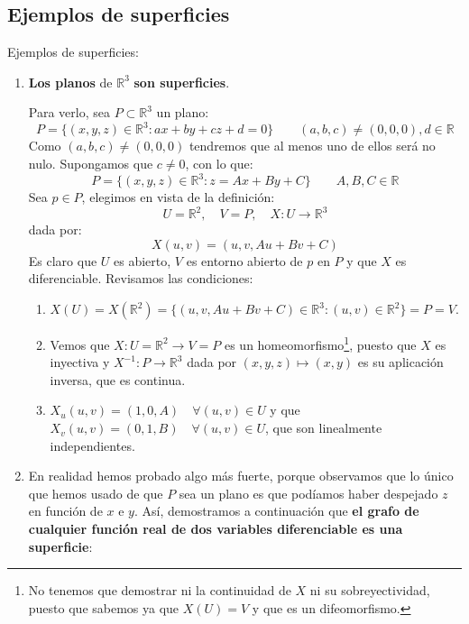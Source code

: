 \subsection{Ejemplos de superficies}
\begin{ejemplo}
    Ejemplos de superficies:
    \begin{enumerate}
        \item \textbf{Los planos} de $\mathbb{R}^3$ \textbf{son superficies}.

            Para verlo, sea $P\subset\mathbb{R}^3$ un plano:
            \begin{equation*}
                P = \{(x,y,z)\in \mathbb{R}^3 : ax + by + cz + d= 0\} \qquad (a,b,c)\neq (0,0,0), d\in \mathbb{R}
            \end{equation*}
            Como $(a,b,c)\neq (0,0,0)$ tendremos que al menos uno de ellos será no nulo. Supongamos que $c\neq 0$, con lo que:
            \begin{equation*}
                P = \{(x,y,z)\in \mathbb{R}^3 : z = Ax + By + C\} \qquad A,B,C\in \mathbb{R}
            \end{equation*}
            Sea $p\in P$, elegimos en vista de la definición:
            \begin{equation*}
                U = \mathbb{R}^2, \quad V = P, \quad X:U\to \mathbb{R}^3
            \end{equation*}
            dada por:
            \begin{equation*}
                X(u,v) = (u, v, Au + Bv + C)
            \end{equation*}
            Es claro que $U$ es abierto, $V$ es entorno abierto de $p$ en $P$ y que $X$ es diferenciable. Revisamos las condiciones:
            \begin{enumerate}
                \item[1.] $X(U) = X(\mathbb{R}^2) = \{(u,v,Au+Bv+C) \in \mathbb{R}^3 : (u,v)\in \mathbb{R}^2\} = P = V$.
                \item[2.] Vemos que $X:U=\mathbb{R}^2\to V=P$ es un homeomorfismo\footnote{No tenemos que demostrar ni la continuidad de $X$ ni su sobreyectividad, puesto que sabemos ya que $X(U) = V$ y que es un difeomorfismo.}, puesto que $X$ es inyectiva y $X^{-1}:P\to \mathbb{R}^3$ dada por $(x,y,z)\mapsto (x,y)$ es su aplicación inversa, que es continua.
                \item[3.] $X_u(u,v) = (1,0,A)\quad \forall (u,v)\in U$ y que $X_v(u,v) = (0,1,B)\quad \forall (u,v)\in U$, que son linealmente independientes.
            \end{enumerate}
        \item En realidad hemos probado algo más fuerte, porque observamos que lo único que hemos usado de que $P$ sea un plano es que podíamos haber despejado $z$ en función de $x$ e $y$. Así, demostramos a continuación que \textbf{el grafo de cualquier función real de dos variables diferenciable es una superficie}:


\end{enumerate}
\end{ejemplo}

